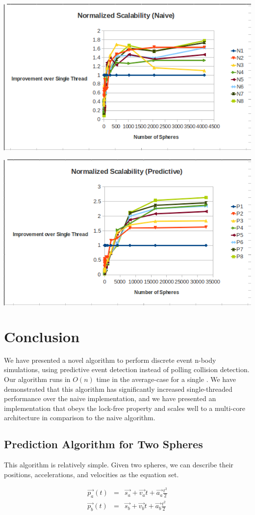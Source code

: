 \documentclass[conference]{IEEEtran}
\begin{document}
\begin{center}
	\includegraphics[width=.45\textwidth]{normalized_scalability_naive.png}
\end{center}

\begin{center}
	\includegraphics[width=.45\textwidth]{normalized_scalability_predictive.png}
\end{center}

\section{Conclusion} 

We have presented a novel algorithm to perform discrete event n-body simulations, using predictive event detection instead of polling collision detection.  Our algorithm runs in $O(n)$ time in the average-case for a single .  We have demonstrated that this algorithm has significantly increased single-threaded performance over the naive implementation, and we have presented an implementation that obeys the lock-free property and scales well to a multi-core architecture in comparison to the naive algorithm.




\appendix %
\subsection{Prediction Algorithm for Two Spheres}
\label{predict}
This algorithm is relatively simple.  Given two spheres, we can describe their positions, accelerations, and velocities as the equation set.

\begin{eqnarray*}
\vec{p_a}(t)&=&\vec{s_a}+\vec{v_a} t+\vec{a_a} \frac{t ^ 2}{2} \\
\vec{p_b}(t)&=&\vec{s_b}+\vec{v_b} t+\vec{a_b} \frac{t ^ 2}{2} \\
\end{eqnarray*}
\end{document}

